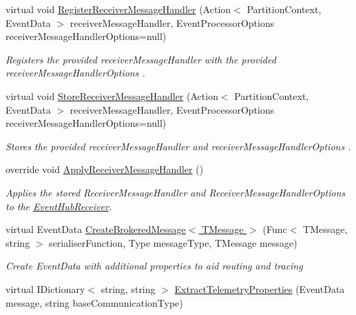 \begin{DoxyCompactItemize}
virtual void \hyperlink{classCqrs_1_1Azure_1_1ServiceBus_1_1AzureEventHub_afbea0e107f3d4e8f8d4f2215ff2f7787_afbea0e107f3d4e8f8d4f2215ff2f7787}{Register\+Receiver\+Message\+Handler} (Action$<$ Partition\+Context, Event\+Data $>$ receiver\+Message\+Handler, Event\+Processor\+Options receiver\+Message\+Handler\+Options=null)
\begin{DoxyCompactList}\small\item\em Registers the provided {\itshape receiver\+Message\+Handler}  with the provided {\itshape receiver\+Message\+Handler\+Options} . \end{DoxyCompactList}\item 
virtual void \hyperlink{classCqrs_1_1Azure_1_1ServiceBus_1_1AzureEventHub_a5924517b1e88c09e3c0c1aec9c737a8d_a5924517b1e88c09e3c0c1aec9c737a8d}{Store\+Receiver\+Message\+Handler} (Action$<$ Partition\+Context, Event\+Data $>$ receiver\+Message\+Handler, Event\+Processor\+Options receiver\+Message\+Handler\+Options=null)
\begin{DoxyCompactList}\small\item\em Stores the provided {\itshape receiver\+Message\+Handler}  and {\itshape receiver\+Message\+Handler\+Options} . \end{DoxyCompactList}\item 
override void \hyperlink{classCqrs_1_1Azure_1_1ServiceBus_1_1AzureEventHub_af2efc497815828b6fe0b4d6621bc8b41_af2efc497815828b6fe0b4d6621bc8b41}{Apply\+Receiver\+Message\+Handler} ()
\begin{DoxyCompactList}\small\item\em Applies the stored Receiver\+Message\+Handler and Receiver\+Message\+Handler\+Options to the \hyperlink{classCqrs_1_1Azure_1_1ServiceBus_1_1AzureEventHub_a1b12b47dbb9b9afe2014477a2e457c35_a1b12b47dbb9b9afe2014477a2e457c35}{Event\+Hub\+Receiver}. \end{DoxyCompactList}\item 
virtual Event\+Data \hyperlink{classCqrs_1_1Azure_1_1ServiceBus_1_1AzureEventHub_a8302c7e2f88a666862b3d9fd4531b1f2_a8302c7e2f88a666862b3d9fd4531b1f2}{Create\+Brokered\+Message$<$ T\+Message $>$} (Func$<$ T\+Message, string $>$ serialiser\+Function, Type message\+Type, T\+Message message)
\begin{DoxyCompactList}\small\item\em Create Event\+Data with additional properties to aid routing and tracing \end{DoxyCompactList}\item 
virtual I\+Dictionary$<$ string, string $>$ \hyperlink{classCqrs_1_1Azure_1_1ServiceBus_1_1AzureEventHub_a913284b0c4d40aa59c20c277b45429e5_a913284b0c4d40aa59c20c277b45429e5}{Extract\+Telemetry\+Properties} (Event\+Data message, string base\+Communication\+Type)

\end{DoxyCompactItemize}
